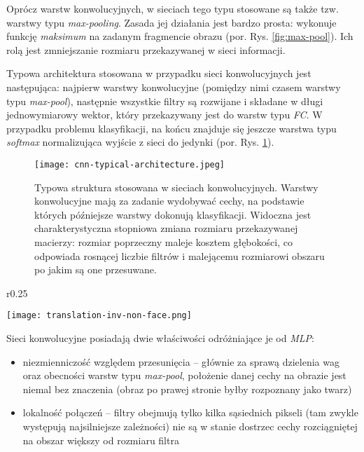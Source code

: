 Oprócz warstw konwolucyjnych, w sieciach tego typu stosowane są także tzw. warstwy typu \textit{max-pooling}. Zasada jej działania jest bardzo prosta: wykonuje funkcję \textit{maksimum} na zadanym fragmencie obrazu (por. Rys. \ref{fig:max-pool}). Ich rolą jest zmniejszanie rozmiaru przekazywanej w sieci informacji.

Typowa architektura stosowana w przypadku sieci konwolucyjnych jest następująca: najpierw warstwy konwolucyjne (pomiędzy nimi czasem warstwy typu \textit{max-pool}), następnie wszystkie filtry są rozwijane i składane w długi jednowymiarowy wektor, który przekazywany jest do warstw typu \textit{FC}. W przypadku problemu klasyfikacji, na końcu znajduje się jeszcze warstwa typu \textit{softmax} normalizująca wyjście z sieci do jedynki (por. Rys. \ref{fig:cnn-arch}). 

\begin{figure}[h]
	\centering
	\texttt{[image: cnn-typical-architecture.jpeg]}
	\caption{Typowa struktura stosowana w sieciach konwolucyjnych. Warstwy konwolucyjne mają za zadanie wydobywać cechy, na podstawie których późniejsze warstwy dokonują klasyfikacji.
	Widoczna jest charakterystyczna stopniowa zmiana rozmiaru przekazywanej macierzy: rozmiar poprzeczny maleje kosztem głębokości, co odpowiada rosnącej liczbie filtrów i malejącemu rozmiarowi obszaru po jakim są one przesuwane.}
	\label{fig:cnn-arch}
\end{figure}



\begin{wrapfigure}[9]{r}{0.25\textwidth}
  \begin{center}
  	\vspace{-1em}
	\texttt{[image: translation-inv-non-face.png]}
   	\label{fig:translation-inv-nonface}
  \end{center}
\end{wrapfigure}

Sieci konwolucyjne posiadają dwie właściwości odróżniające je od \textit{MLP}:
\begin{itemize}
	\item niezmienniczość względem przesunięcia  -- głównie za sprawą dzielenia wag oraz obecności warstw typu \textit{max-pool}, położenie danej cechy na obrazie jest niemal bez znaczenia (obraz po prawej stronie byłby rozpoznany jako twarz)
	\item lokalność połączeń -- filtry obejmują tylko kilka sąsiednich pikseli (tam zwykle występują najsilniejsze zależności) nie są w stanie dostrzec cechy rozciągniętej na obszar większy od rozmiaru filtra
\end{itemize}

